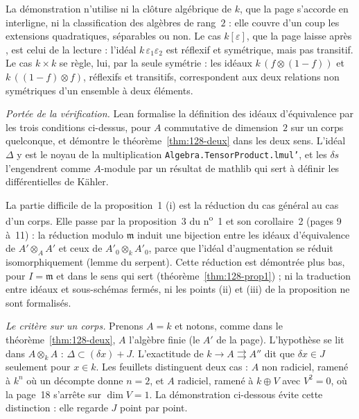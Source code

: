 \begin{remarque}
La démonstration n'utilise ni la clôture algébrique de $k$, que la page s'accorde en interligne, ni la classification des algèbres de rang~$2$ : elle couvre d'un coup les extensions quadratiques, séparables ou non. Le cas $k[\varepsilon]$, que la page laisse après , est celui de la lecture : l'idéal $k\,\varepsilon_1\varepsilon_2$ est réflexif et symétrique, mais pas transitif. Le cas $k \times k$ se règle, lui, par la seule symétrie : les idéaux $k\,(f \otimes (1 - f))$ et $k\,((1 - f) \otimes f)$, réflexifs et transitifs, correspondent aux deux relations non symétriques d'un ensemble à deux éléments.
\end{remarque}

\begingroup\raggedright
\noindent\emph{Portée de la vérification.} Lean formalise la définition des idéaux d'équivalence par les trois conditions ci-dessus, pour $A$ commutative de dimension~$2$ sur un corps quelconque, et démontre le théorème~\ref{thm:128-deux} dans les deux sens. L'idéal $\Delta$ y est le noyau de la multiplication \texttt{Algebra.\allowbreak{}TensorProduct.\allowbreak{}lmul'}, et les $\delta s$ l'engendrent comme $A$-module par un résultat de mathlib qui sert à définir les différentielles de Kähler.\par\endgroup

La partie difficile de la proposition~1 (i) est la réduction du cas général au cas d'un corps. Elle passe par la proposition~3 du n\textsuperscript{o}~1 et son corollaire~2 (pages 9 à~11) : la réduction modulo $\mathfrak m$ induit une bijection entre les idéaux d'équivalence de $A' \otimes_A A'$ et ceux de $A'_0 \otimes_k A'_0$, parce que l'idéal d'augmentation se réduit isomorphiquement (lemme du serpent). Cette réduction est démontrée plus bas, pour $I = \mathfrak m$ et dans le sens qui sert (théorème~\ref{thm:128-prop1}) ; ni la traduction entre idéaux et sous-schémas fermés, ni les points (ii) et (iii) de la proposition ne sont formalisés.

\noindent\emph{Le critère sur un corps.} Prenons $A = k$ et notons, comme dans le théorème~\ref{thm:128-deux}, $A$ l'algèbre finie (le $A'$ de la page). L'hypothèse  se lit dans $A \otimes_k A$ : $\Delta \subset (\delta x) + J$. L'exactitude de $k \to A \rightrightarrows A''$ dit que $\delta x \in J$ seulement pour $x \in k$. Les feuillets distinguent deux cas : $A$ non radiciel, ramené à $k^n$ où un décompte donne $n = 2$, et $A$ radiciel, ramené à $k \oplus V$ avec $V^2 = 0$, où la page~18 s'arrête sur  $\dim V = 1$. La démonstration ci-dessous évite cette distinction : elle regarde $J$ point par point.

